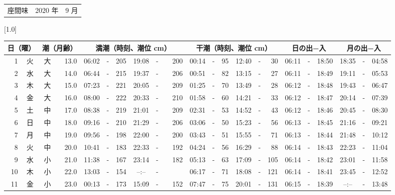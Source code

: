\documentclass[12pt,a4j]{jsarticle}
\begin{document}
 \begin{table}[htbp]
 \begin{center}
 \begin{tabular}{lcc}
 \LARGE{座間味}  & \large{2020 年} & \large{ 9 月} \\
 \end{tabular}
 \end{center}
 \begin{center}
    \scalebox{0.7}[1.0]{
    \begin{tabular}{|rc|cr|ccrccr|ccrccr|ccc|ccc|}
    \hline
    \multicolumn{2}{|c|}{日（曜）} & \multicolumn{2}{c|}{潮（月齢）} & \multicolumn{6}{c|}{満潮（時刻、潮位 cm）} & \multicolumn{6}{c|}{干潮（時刻、潮位 cm）} & \multicolumn{3}{c|}{日の出−入} &  \multicolumn{3}{c|}{月の出−入}\\
 \hline
 1 & 火 & 大 & 13.0 &  06:02 &-& 205 &  19:08 &-& 200 &  00:14 &-&  95 &  12:40 &-&  30 & 06:11 & -& 18:50 & 18:35 & -& 04:58 \\
 2 & 水 & 大 & 14.0 &  06:44 &-& 215 &  19:37 &-& 206 &  00:51 &-&  82 &  13:15 &-&  27 & 06:11 & -& 18:49 & 19:11 & -& 05:53 \\
 3 & 木 & 大 & 15.0 &  07:23 &-& 221 &  20:05 &-& 209 &  01:25 &-&  70 &  13:49 &-&  28 & 06:12 & -& 18:48 & 19:43 & -& 06:47 \\
 4 & 金 & 大 & 16.0 &  08:00 &-& 222 &  20:33 &-& 210 &  01:58 &-&  60 &  14:21 &-&  33 & 06:12 & -& 18:47 & 20:14 & -& 07:39 \\
 5 & 土 & 中 & 17.0 &  08:38 &-& 219 &  21:01 &-& 209 &  02:31 &-&  53 &  14:52 &-&  43 & 06:12 & -& 18:46 & 20:45 & -& 08:30 \\
 6 & 日 & 中 & 18.0 &  09:16 &-& 210 &  21:29 &-& 206 &  03:06 &-&  50 &  15:23 &-&  56 & 06:13 & -& 18:45 & 21:16 & -& 09:21 \\
 7 & 月 & 中 & 19.0 &  09:56 &-& 198 &  22:00 &-& 200 &  03:43 &-&  51 &  15:55 &-&  71 & 06:13 & -& 18:44 & 21:48 & -& 10:12 \\
 8 & 火 & 中 & 20.0 &  10:41 &-& 183 &  22:33 &-& 192 &  04:24 &-&  56 &  16:29 &-&  88 & 06:14 & -& 18:43 & 22:23 & -& 11:04 \\
 9 & 水 & 小 & 21.0 &  11:38 &-& 167 &  23:14 &-& 182 &  05:13 &-&  63 &  17:09 &-& 105 & 06:14 & -& 18:42 & 23:01 & -& 11:58 \\
10 & 木 & 小 & 22.0 &  13:03 &-& 154 &  --:-- &-&~~~~~ &  06:17 &-&  71 &  18:08 &-& 121 & 06:14 & -& 18:41 & 23:45 & -& 12:52 \\
11 & 金 & 小 & 23.0 &  00:13 &-& 173 &  15:09 &-& 152 &  07:47 &-&  75 &  20:01 &-& 131 & 06:15 & -& 18:39 & --:-- & -& 13:48 \\

\end{tabular}}
\end{center}
\end{table}
\end{document}
